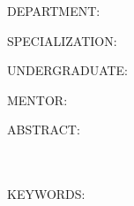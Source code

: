 {{        DEPARTMENT:~~~~\@edepart
        \vspace{-5pt}

        SPECIALIZATION:~~~~\@esubject
        \vspace{5pt}

        UNDERGRADUATE:~~~~\@eauthor
        \vspace{5pt}

        MENTOR:~~~~\@esupervisor
        \vspace{5pt}

        ABSTRACT:~~~~
      }

      \vspace{1cm}

      \markboth{}{}

      \@eabstract\\
      \\
      KEYWORDS:~\@ekeywords

      \clearpage


    \tableofcontents
    \markboth{\contentsname}{\contentsname}
    \clearpage
    \setcounter{page}{1}

}

\makeatother
